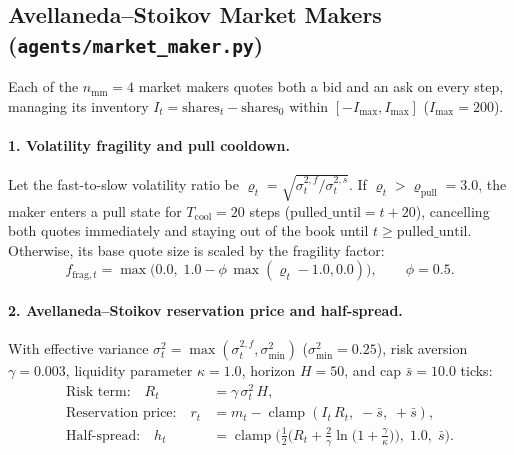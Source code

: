 \documentclass[11pt,a4paper]{article}
\newcommand{\code}[1]{\texttt{#1}}
\newcommand{\clamp}{\operatorname{clamp}}
\begin{document}
\subsection[Market Makers with Detection and Fragility]{Avellaneda--Stoikov Market Makers (\code{agents/market\_maker.py})}
\label{sec:mm}

Each of the $n_{\text{mm}} = 4$ market makers quotes both a bid and an ask on every step, managing its
inventory $I_t = \text{shares}_t - \text{shares}_0$ within $[-I_{\max}, I_{\max}]$ ($I_{\max} = 200$).

\paragraph{1. Volatility fragility and pull cooldown.} Let the fast-to-slow volatility ratio be
$\varrho_t = \sqrt{\sigma^{2,f}_t / \sigma^{2,s}_t}$. If $\varrho_t > \varrho_{\text{pull}} = 3.0$, the
maker enters a pull state for $T_{\text{cool}} = 20$ steps ($\text{pulled\_until} = t + 20$), cancelling
both quotes immediately and staying out of the book until $t \ge \text{pulled\_until}$. Otherwise, its
base quote size is scaled by the fragility factor:
\begin{equation}
  f_{\text{frag},t} = \max\!\big(0.0,\; 1.0 - \phi\,\max(\varrho_t - 1.0, 0.0)\big), \qquad \phi = 0.5.
\end{equation}

\paragraph{2. Avellaneda--Stoikov reservation price and half-spread.} With effective variance
$\sigma^2_t = \max(\sigma^{2,f}_t, \sigma^2_{\min})$ ($\sigma^2_{\min} = 0.25$), risk aversion
$\gamma = 0.003$, liquidity parameter $\kappa = 1.0$, horizon $H = 50$, and cap $\bar s = 10.0$ ticks:
\begin{align}
  \text{Risk term:}\quad R_t &= \gamma\,\sigma^2_t\,H, \\
  \text{Reservation price:}\quad r_t &= m_t - \clamp(I_t\,R_t,\; -\bar s,\; +\bar s), \\
  \text{Half-spread:}\quad h_t &= \clamp\!\Big(\frac{1}{2}\Big(R_t + \frac{2}{\gamma}\ln\!\big(1 + \frac{\gamma}{\kappa}\big)\Big),\; 1.0,\; \bar s\Big).
\end{align}
\end{document}

